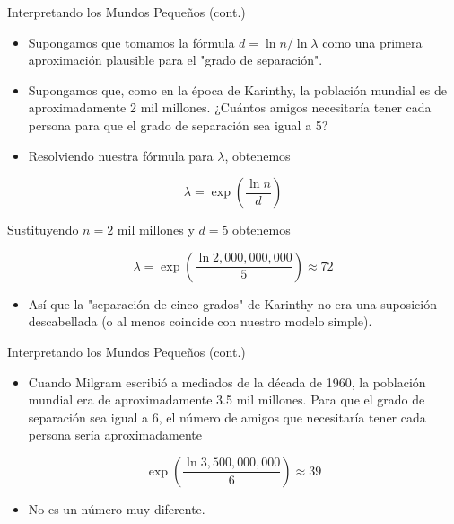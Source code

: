 \documentclass[11pt]{beamer}
\begin{document}
\begin{frame}{Interpretando los Mundos Pequeños (cont.)}
\begin{itemize}
  \item Supongamos que tomamos la fórmula $d=\ln n / \ln \lambda$ como una primera aproximación plausible para el "grado de separación".
  \item Supongamos que, como en la época de Karinthy, la población mundial es de aproximadamente 2 mil millones. ¿Cuántos amigos necesitaría tener cada persona para que el grado de separación sea igual a 5?
  \item Resolviendo nuestra fórmula para $\lambda$, obtenemos
\end{itemize}

$$
\lambda=\exp \left(\frac{\ln n}{d}\right)
$$

Sustituyendo $n=2$ mil millones y $d=5$ obtenemos

$$
\lambda=\exp \left(\frac{\ln 2,000,000,000}{5}\right) \approx 72
$$

\begin{itemize}
  \item Así que la "separación de cinco grados" de Karinthy no era una suposición descabellada (o al menos coincide con nuestro modelo simple).
\end{itemize}
    
\end{frame}


\begin{frame}{Interpretando los Mundos Pequeños (cont.)}
\begin{itemize}
  \item Cuando Milgram escribió a mediados de la década de 1960, la población mundial era de aproximadamente 3.5 mil millones. Para que el grado de separación sea igual a 6, el número de amigos que necesitaría tener cada persona sería aproximadamente
\end{itemize}

$$
\exp \left(\frac{\ln 3,500,000,000}{6}\right) \approx 39
$$

\begin{itemize}
  \item No es un número muy diferente.
\end{itemize}
\end{frame}
\end{document}
